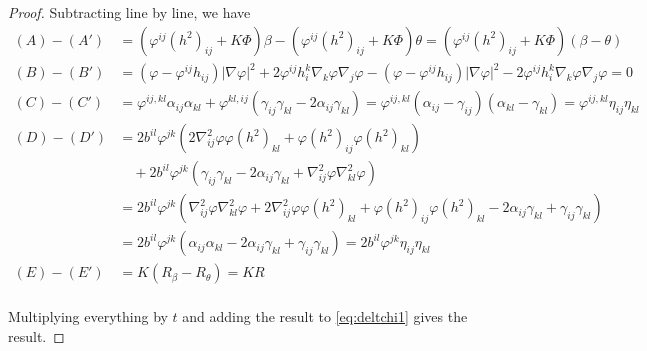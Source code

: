 \documentclass{amsart}
\begin{document}
\begin{proof}
Subtracting line by line, we have
\begin{align*}
(A) - (A') &= \left(\varphi^{ij}(h^2)_{ij} + K\Phi \right)\beta - \left(\varphi^{ij}(h^2)_{ij} + K\Phi \right)\theta = \left(\varphi^{ij}(h^2)_{ij} + K\Phi \right)(\beta - \theta) \\
(B) - (B') &= (\varphi - \varphi^{ij}h_{ij}) |\nabla\varphi|^{2} + 2\varphi^{ij}h^{k}_{i}\nabla_k \varphi \nabla_j \varphi - (\varphi - \varphi^{ij}h_{ij})|\nabla\varphi|^{2} - 2\varphi^{ij}h^{k}_{i}\nabla_k\varphi\nabla_j\varphi = 0 \\
(C) - (C') &= \varphi^{ij,kl} \alpha_{ij} \alpha_{kl} + \varphi^{kl,ij} (\gamma_{ij}\gamma_{kl}  - 2\alpha_{ij} \gamma_{kl}) = \varphi^{ij,kl} (\alpha_{ij} - \gamma_{ij}) (\alpha_{kl} - \gamma_{kl}) = \varphi^{ij,kl} \eta_{ij} \eta_{kl} \\
(D) - (D') &= 2b^{il}\varphi^{jk} (2\nabla^2_{ij}\varphi\varphi(h^2)_{kl} + \varphi(h^2)_{ij}\varphi(h^2)_{kl}) \\
&\quad + 2b^{il} \varphi^{jk} \left(\gamma_{ij} \gamma_{kl} - 2\alpha_{ij} \gamma_{kl} + \nabla^2_{ij}\varphi\nabla^2_{kl}\varphi\right) \\
&= 2b^{il}\varphi^{jk} \left(\nabla^2_{ij}\varphi\nabla^2_{kl}\varphi +2\nabla^2_{ij}\varphi\varphi(h^2)_{kl} + \varphi(h^2)_{ij}\varphi(h^2)_{kl} - 2 \alpha_{ij} \gamma_{kl} + \gamma_{ij} \gamma_{kl} \right) \\
&= 2b^{il}\varphi^{jk} \left(\alpha_{ij}\alpha_{kl} - 2 \alpha_{ij} \gamma_{kl} + \gamma_{ij} \gamma_{kl} \right) = 2b^{il}\varphi^{jk} \eta_{ij} \eta_{kl} \\
(E) - (E') &= K(R_{\beta} - R_{\theta}) = KR\\
\end{align*}

Multiplying everything by \(t\) and adding the result to \cref{eq:deltchi1} gives the result.
\end{proof}
	




\end{document}

